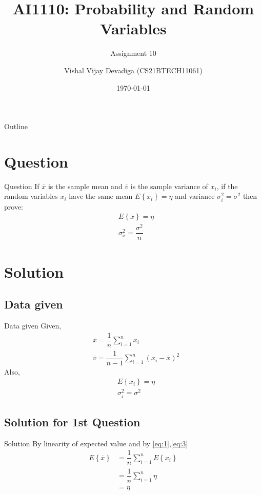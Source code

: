 \documentclass{beamer}
\title{AI1110: Probability and Random Variables}
\subtitle{Assignment 10}
\author{Vishal Vijay Devadiga (CS21BTECH11061)}
\date{\today}
\providecommand{\ovl}[1]{\ensuremath{\overline{#1}}}
\providecommand{\brak}[1]{\ensuremath{\left(#1\right)}}
\providecommand{\cbrak}[1]{\ensuremath{\left\{#1\right\}}}
\begin{document}
\begin{frame}
    \titlepage
\end{frame}

\logo{}

\begin{frame}{Outline}
    \tableofcontents
\end{frame}

\section{Question}
\begin{frame}{Question}
    If $\ovl{x}$ is the sample mean and $\ovl{v}$ is the sample variance of $x_i$, 
    if the random variables $x_i$ have the same mean $E\cbrak{x_i} = \eta$ and variance $\sigma_i^2 = \sigma^2$
    then prove:
    \begin{align}
        &E\cbrak{\ovl{x}} = \eta
        \\
        &\sigma^2_{\ovl{x}} = \dfrac{\sigma^2}{n}
    \end{align}
\end{frame}

\section{Solution}
\subsection{Data given}
\begin{frame}{Data given}
    Given,
    \begin{align}
        \label{eq:1}
        &\ovl{x} = \dfrac{1}{n}\sum^{n}_{i=1} x_i
        \\
        \label{eq:2}
        &\ovl{v} = \dfrac{1}{n-1}\sum^{n}_{i=1}\brak{x_i - \ovl{x}}^2
    \end{align}
    Also,
    \begin{align}
        \label{eq:3}
        &E\cbrak{x_i} = \eta
        \\
        \label{eq:4}
        &\sigma_i^2 = \sigma^2
    \end{align}
\end{frame}

\subsection{Solution for 1st Question}
\begin{frame}{Solution}
    By linearity of expected value and by \eqref{eq:1},\eqref{eq:3}
    \begin{align}
        E\cbrak{\ovl{x}} &= \dfrac{1}{n}\sum^{n}_{i=1} E\cbrak{x_i}
        \\
        &= \dfrac{1}{n}\sum^{n}_{i=1} \eta
        \\
        &= \eta
    \end{align}
\end{frame}
\end{document}
